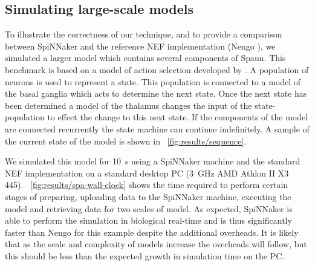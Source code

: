 \documentclass[conference]{IEEEtran}
\begin{document}
  \subsection{Simulating large-scale models}
  \label{sec:spa-sequence}

  To illustrate the correctness of our technique, and to provide a comparison between SpiNNaker and the reference NEF implementation (Nengo \parencite{Bekolay2014}), we simulated a larger model which contains several components of Spaun.
  This benchmark is based on a model of action selection developed by \textcite{Stewart2010}.
  A population of neurons is used to represent a state.
  This population is connected to a model of the basal ganglia which acts to determine the next state.
  Once the next state has been determined a model of the thalamus changes the input of the state-population to effect the change to this next state.
  If the components of the model are connected recurrently the state machine can continue indefinitely.
  A sample of the current state of the model is shown in \figurename~\ref{fig:results/sequence}.

  We simulated this model for \SI{10}{\second} using a SpiNNaker machine and the standard NEF implementation on a standard desktop PC (\SI{3}{\giga\hertz} AMD Athlon II X3 445).
  \figurename~\ref{fig:results/spa-wall-clock} shows the time required to perform certain stages of preparing, uploading data to the SpiNNaker machine, executing the model and retrieving data for two scales of model.
  As expected, SpiNNaker is able to perform the simulation in biological real-time and is thus significantly faster than Nengo for this example despite the additional overheads.
  It is likely that as the scale and complexity of models increase the overheads will follow, but this should be less than the expected growth in simulation time on the PC.
\end{document}
